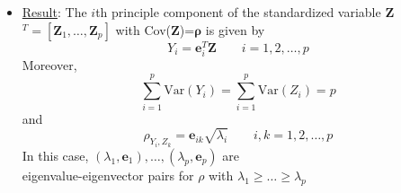 \documentclass[a4paper]{beamer}
\begin{document}
\begin{frame}
\begin{itemize}
\item \underline{Result}: The $i$th principle component of the standardized variable \textbf{Z}$^T =[ \textbf{Z}_1,\ldots, \textbf{Z}_p]$ with Cov(\textbf{Z})=$\boldsymbol{\rho}$ is given by
$$Y_i = \textbf{e}_i^T\textbf{Z}\qquad i = 1,2,\ldots ,p$$
Moreover, 
$$\sum^p_{i=1}\text{Var}(Y_i) = \sum^p_{i=1}\text{Var}(Z_i) = p$$
and 
$$\rho_{Y_i,Z_k} = \textbf{e}_{ik}\sqrt{\lambda_i}\qquad i,k=1,2,\ldots,p$$
In this case, $(\lambda_1,\textbf{e}_1), \ldots, (\lambda_p,\textbf{e}_p)$ are \\
eigenvalue-eigenvector pairs for $\rho$ with $\lambda_1\geq\ldots\geq\lambda_p$
\end{itemize}
\end{frame}
\end{document}
